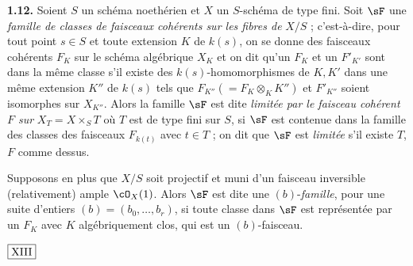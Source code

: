 \smallskip
\noindent\textbf{1.12.} Soient $S$ un schéma noethérien et $X$ un $S$-schéma de type fini. Soit $\sF$ une \emph{famille de classes de faisceaux cohérents sur les fibres de} $X/S$ ; c'est-à-dire, pour tout point $s \in S$ et toute extension $K$ de $k(s)$, on se donne des faisceaux cohérents $F_K$ sur le schéma algébrique $X_K$ et on dit qu'un $F_K$ et un $F'_{K'}$ sont dans la même classe s'il existe des $k(s)$-homomorphismes de $K, K'$ dans une même extension $K''$ de $k(s)$ tels que $F_{K''} (= F_K \otimes_K K'')$ et $F'_{K''}$ soient isomorphes sur $X_{K''}$. Alors la famille $\sF$ est dite \emph{limitée par le faisceau cohérent $F$ sur} $X_T = X \times_S T$ où $T$ est de type fini sur $S$, si $\sF$ est contenue dans la famille des classes des faisceaux $F_{k(t)}$ avec $t \in T$ ; on dit que $\sF$ est \emph{limitée} s'il existe $T$, $F$ comme dessus.

Supposons en plus que $X/S$ soit projectif et muni d'un faisceau inversible (relativement) ample $\cO_X(1)$. Alors $\sF$ est dite une $(b)$-\emph{famille}, pour une suite d'entiers $(b) = (b_0, \ldots, b_r)$, si toute classe dans $\sF$ est représentée par un $F_K$ avec $K$ algébriquement clos, qui est un $(b)$-faisceau.

\begin{flushright}
$\fbox{\text{XIII}}$
\end{flushright}

